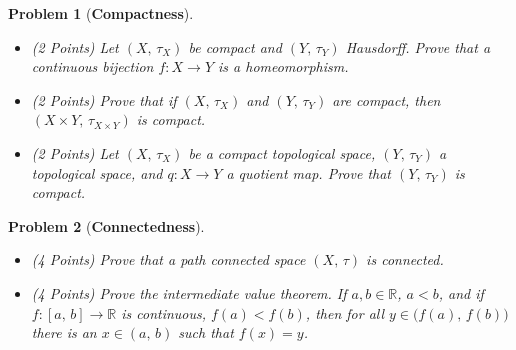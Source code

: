 \documentclass{article}
\theoremstyle{normal}
\newtheorem{problem}{Problem}
\begin{document}
    \clearpage
    \begin{problem}[\textbf{Compactness}]
        \par\hfill\par\vspace{2em}
        \begin{itemize}
            \item
            (2 Points) Let $(X,\,\tau_{X})$ be compact and
            $(Y,\,\tau_{Y})$ Hausdorff. Prove that a continuous bijection
            $f:X\rightarrow{Y}$ is a homeomorphism.
            \item
            (2 Points)
            Prove that if $(X,\,\tau_{X})$ and $(Y,\,\tau_{Y})$ are
            compact, then $(X\times{Y},\,\tau_{X\times{Y}})$ is compact.
            \item
            (2 Points)
            Let $(X,\,\tau_{X})$ be a compact topological space,
            $(Y,\,\tau_{Y})$ a topological space, and $q:X\rightarrow{Y}$ a
            quotient map. Prove that $(Y,\,\tau_{Y})$ is compact.
        \end{itemize}
    \end{problem}
    \clearpage
    \begin{problem}[\textbf{Connectedness}]
        \par\hfill\par\vspace{2em}
        \begin{itemize}
            \item
            (4 Points)
            Prove that a path connected space $(X,\,\tau)$ is connected.
            \item
            (4 Points)
            Prove the intermediate value theorem. If
            $a,b\in\mathbb{R}$, $a<b$, and if $f:[a,\,b]\rightarrow\mathbb{R}$
            is continuous, $f(a)<f(b)$, then for all
            $y\in\big(f(a),\,f(b)\big)$ there is an $x\in(a,\,b)$ such that
            $f(x)=y$.
        \end{itemize}
    \end{problem}
    \clearpage
\end{document}
